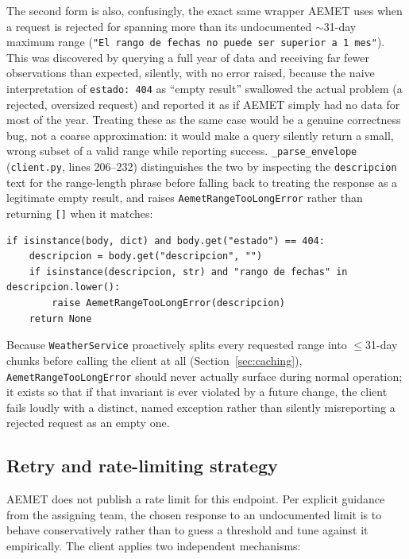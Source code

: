 \documentclass[11pt,a4paper]{article}
\begin{document}
The second form is also, confusingly, the exact same wrapper AEMET uses
when a request is rejected for spanning more than its undocumented
$\sim$31-day maximum range (\texttt{"El rango de fechas no puede ser
superior a 1 mes"}). This was discovered by querying a full year of data
and receiving far fewer observations than expected, silently, with no error
raised, because the naive interpretation of \texttt{estado: 404} as ``empty
result'' swallowed the actual problem (a rejected, oversized request) and
reported it as if AEMET simply had no data for most of the year. Treating
these as the same case would be a genuine correctness bug, not a coarse
approximation: it would make a query silently return a small, wrong subset
of a valid range while reporting success. \texttt{\_parse\_envelope}
(\texttt{client.py}, lines 206--232) distinguishes the two by inspecting
the \texttt{descripcion} text for the range-length phrase before falling
back to treating the response as a legitimate empty result, and raises
\texttt{AemetRangeTooLongError} rather than returning \texttt{[]} when it
matches:

\begin{lstlisting}[caption={Disambiguating two meanings of the same wrapper. \texttt{backend/app/integrations/aemet/client.py}, lines 221--225.}]
if isinstance(body, dict) and body.get("estado") == 404:
    descripcion = body.get("descripcion", "")
    if isinstance(descripcion, str) and "rango de fechas" in descripcion.lower():
        raise AemetRangeTooLongError(descripcion)
    return None
\end{lstlisting}

Because \texttt{WeatherService} proactively splits every requested range
into $\le$31-day chunks before calling the client at all
(Section~\ref{sec:caching}), \texttt{AemetRangeTooLongError} should never
actually surface during normal operation; it exists so that if that
invariant is ever violated by a future change, the client fails loudly with
a distinct, named exception rather than silently misreporting a rejected
request as an empty one.

\subsection{Retry and rate-limiting strategy}
\label{sec:retry-strategy}

AEMET does not publish a rate limit for this endpoint. Per explicit
guidance from the assigning team, the chosen response to an undocumented
limit is to behave conservatively rather than to guess a threshold and tune
against it empirically. The client applies two independent mechanisms:
\end{document}
